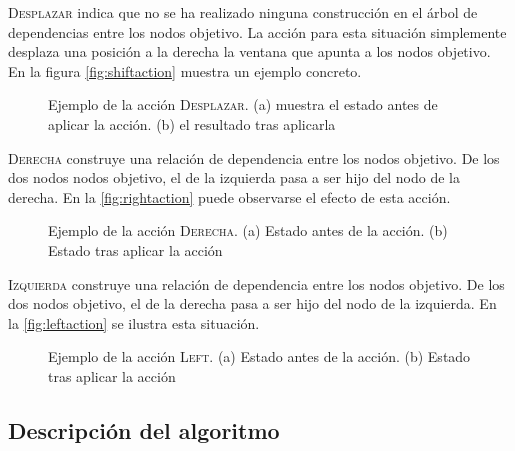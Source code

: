 \textsc{Desplazar} indica que no se ha realizado ninguna construcción en el
árbol de dependencias entre los nodos objetivo. La acción para esta situación
simplemente desplaza una posición a la derecha la ventana que apunta a los nodos
objetivo. En la figura \autoref{fig:shiftaction} muestra un ejemplo concreto.
\begin{figure}[ht]
  \caption{Ejemplo de la acción \textsc{Desplazar}. (a) muestra el estado antes
    de aplicar la acción. (b) el resultado tras aplicarla}
  \label{fig:shiftaction}
\end{figure}
\textsc{Derecha} construye una relación de dependencia entre los nodos
objetivo. De los dos nodos nodos objetivo, el de la izquierda pasa a ser hijo
del nodo de la derecha. En la \autoref{fig:rightaction} puede observarse el
efecto de esta acción.
\begin{figure}[ht]
  \caption{Ejemplo de la acción \textsc{Derecha}. (a) Estado antes de la
    acción. (b) Estado tras aplicar la acción}
  \label{fig:rightaction}
\end{figure}
\textsc{Izquierda} construye una relación de dependencia entre los nodos
objetivo. De los dos nodos objetivo, el de la derecha pasa a ser hijo del nodo
de la izquierda. En la \autoref{fig:leftaction} se ilustra esta situación.
\begin{figure}[ht]
  \caption{Ejemplo de la acción \textsc{Left}. (a) Estado antes de la
    acción. (b) Estado tras aplicar la acción}
  \label{fig:leftaction}
\end{figure}

\subsection{Descripción del algoritmo}
\label{subsec:algdesc}

